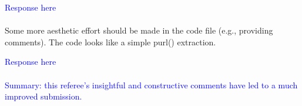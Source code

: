 \documentclass[12pt]{article}
\begin{document}
\textcolor{blue}{Response here}\\ \\

Some more aesthetic effort should be made in the code file (e.g., providing
comments). The code looks like a simple purl() extraction.

\textcolor{blue}{Response here}\\ \\


\textcolor{blue}{Summary: this referee's insightful and
  constructive comments have led to a much improved submission.}
\end{document}
